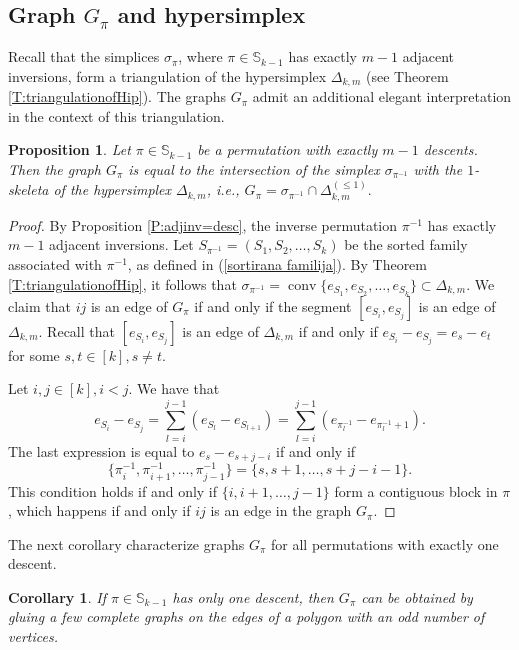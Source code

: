 \documentclass{birkjour}
\newtheorem{cor}[thm]{Corollary}
\newtheorem{prop}[thm]{Proposition}
\theoremstyle{definition}
\theoremstyle{remark}
\numberwithin{equation}{section}
\begin{document}
\subsection{Graph $G_\pi$ and hypersimplex}
Recall that the simplices $\sigma_\pi$, where $\pi\in\mathbb
S_{k-1}$ has exactly $m-1$ adjacent inversions, form a
triangulation of the hypersimplex $\Delta_{k,m}$ (see Theorem
\ref{T:triangulationofHip}). The graphs $G_\pi$ admit an
additional elegant interpretation in the context of this
triangulation.

\begin{prop}
Let $\pi \in \mathbb{S}_{k-1}$ be a permutation with exactly $m-1$
descents. Then the graph $G_\pi$ is equal to the intersection of
the simplex $\sigma_{\pi^{-1}}$ with the $1$-skeleta of the
hypersimplex $\Delta_{k,m}$, i.e., $G_\pi=\sigma_{\pi^{-1}}\cap
\Delta^{(\leq 1)}_{k,m}.$
\end{prop}

\begin{proof}
 By Proposition \ref{P:adjinv=desc}, the inverse permutation
 $\pi^{-1}$ has exactly $m-1$ adjacent inversions. Let
$S_{\pi^{-1}}=(S_1,S_2,\ldots,S_k)$ be the sorted family
associated with $\pi^{-1}$, as defined in (\ref{sortirana
familija}). By Theorem \ref{T:triangulationofHip}, it follows that
$\sigma_{\pi^{-1}}=\operatorname{conv}\{e_{S_1}
,e_{S_2},\ldots,e_{S_k}\}\subset \Delta_{k,m}$. We claim that $ij$
is an edge of $G_\pi$ if and only if the segment
$[e_{S_i},e_{S_j}]$ is an edge of $\Delta_{k,m}$. Recall that
$[e_{S_i},e_{S_j}]$ is an edge of $\Delta_{k,m}$ if and only if
$e_{S_i}-e_{S_j}=e_s-e_t$ for some $s,t\in[k],s\neq t$.

Let $i,j\in[k],i<j$. We have that
\[e_{S_i}-e_{S_j}=\sum_{l=i}^{j-1}
(e_{S_l}-e_{S_{l+1}})=\sum_{l=i}^{j-1}(e_{\pi^{-1}_{l}}-
e_{\pi^{-1}_{l}+1}).\] The last expression is equal to
$e_s-e_{s+j-i}$
 if and only if
$$\{\pi^{-1}_i,\pi^{-1}_{i+1},\ldots,\pi^{-1}_{j-1}\}=
\{s,s+1,\ldots,s+j-i-1\}.$$
 This condition holds if and only if
  $\{i,i+1,\ldots,j-1\}$ form a contiguous block in $\pi$,
   which happens if and only if $ij$ is an edge in the graph $G_\pi$.
\end{proof}
The next corollary characterize graphs $G_\pi$ for all
permutations with exactly one descent.
\begin{cor}If $\pi\in \mathbb{S}_{k-1}$
has only one descent, then $G_\pi$ can be obtained by gluing a few
complete graphs on the edges of a polygon with an odd number of
vertices.
\end{cor}
\end{document}
